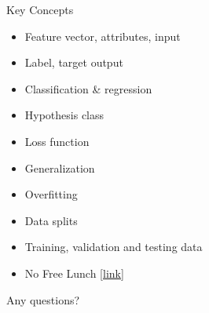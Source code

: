 \documentclass[aspectratio=169,10pt]{beamer}
\begin{document}
\begin{frame}{Key Concepts}
	\begin{itemize}
		\item Feature vector, attributes, input
		\item Label, target output
		\item Classification \& regression
		\item Hypothesis class
		\item Loss function
		\item Generalization
		\item Overfitting
		\item Data splits
		\item Training, validation and testing data
		\item No Free Lunch [\href{https://en.wikipedia.org/wiki/No_free_lunch_theorem}{link}]
	\end{itemize}
\end{frame}

	
\begin{frame}[t,standout]
	\Large
	Any questions?
\end{frame}

%	
%	
%	

\end{document}
